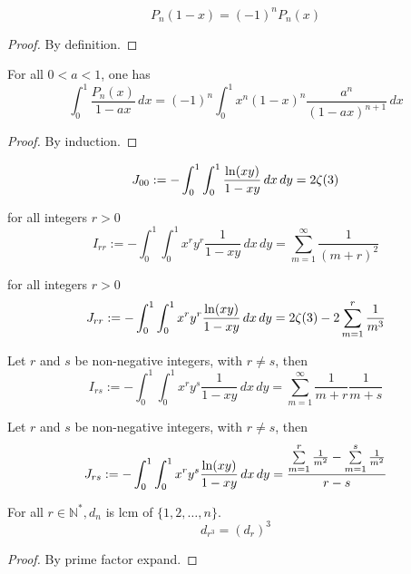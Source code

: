 \begin{lemma}\label{Legendre_poly_sym}
    \[ P_n(1-x)=(-1)^nP_n(x) \]
\end{lemma}
\begin{proof}
    \leanok
    By definition.
\end{proof}

\begin{lemma}\label{Legendre_poly_mul_frac_integral}
    For all $ 0 < a < 1$, one has
    \[ \int_{0}^{1}\frac{P_n(x)}{1 - ax} \, dx =(-1)^n \int_{0}^{1} x^n(1-x)^n\frac{a^n}{(1 - ax)^{n+1}} \, dx \]
\end{lemma}
\begin{proof}
    \leanok
    By induction.
\end{proof}

\begin{lemma}\label{integral_zeta_3}
    \[ J_{00} := -\int_{0}^{1}\int_{0}^{1} \frac{{\rm ln}(xy)}{1-xy} \, dx \, dy = 2\zeta(3) \]
\end{lemma}

\begin{lemma}\label{I_rr}
    for all integers $r > 0$
    \[ I_{rr} := -\int_{0}^{1}\int_{0}^{1} x^ry^r\frac{1}{1-xy} \, dx \, dy = \sum\limits_{m = 1}^{\infty}\frac{1}{(m+r)^2} \]
\end{lemma}

\begin{lemma}\label{J_rr}
    for all integers $r > 0$
    \[ J_{rr} := -\int_{0}^{1}\int_{0}^{1} x^ry^r\frac{{\rm ln}(xy)}{1-xy} \, dx \, dy = 2\zeta(3) - 2 \sum\limits_{m = 1}^{r}\frac{1}{m^3} \]
\end{lemma}

\begin{lemma}\label{I_rs}
    Let $r$ and $s$ be non-negative integers, with $r \neq s$, then
    \[ I_{rs} := -\int_{0}^{1}\int_{0}^{1} x^ry^s\frac{1}{1-xy} \, dx \, dy = \sum\limits_{m = 1}^{\infty}\frac{1}{m+r}\frac{1}{m+s} \]
\end{lemma}

\begin{lemma}\label{J_rs}
    Let $r$ and $s$ be non-negative integers, with $r \neq s$, then
    \[ J_{rs} := -\int_{0}^{1}\int_{0}^{1} x^ry^s\frac{{\rm ln}(xy)}{1-xy} \, dx \, dy = \frac{\sum\limits_{m = 1}^{r}\frac{1}{m^2} - \sum\limits_{m = 1}^{s}\frac{1}{m^2}}{r - s} \]
\end{lemma}

\begin{lemma}\label{d_r_3}
    For all $r \in \mathbb{N}^*, d_n$ is lcm of $\{1, 2, \ldots, n\}.$ 
    \[ d_{r^3} = (d_r)^3 \]
\end{lemma}
\begin{proof}
    \leanok
    By prime factor expand.
\end{proof}

